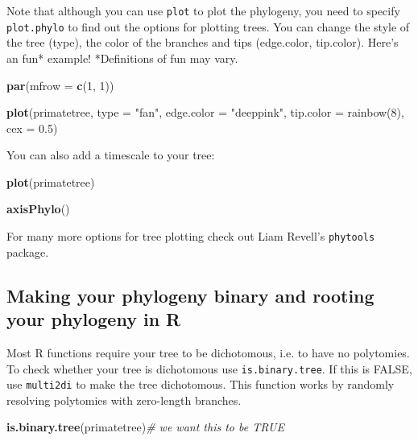 \documentclass[11pt]{article}
\newcommand{\KeywordTok}[1]{\textcolor[rgb]{0.13,0.29,0.53}{\textbf{{#1}}}}
\newcommand{\DataTypeTok}[1]{\textcolor[rgb]{0.13,0.29,0.53}{{#1}}}
\newcommand{\DecValTok}[1]{\textcolor[rgb]{0.00,0.00,0.81}{{#1}}}
\newcommand{\FloatTok}[1]{\textcolor[rgb]{0.00,0.00,0.81}{{#1}}}
\newcommand{\StringTok}[1]{\textcolor[rgb]{0.31,0.60,0.02}{{#1}}}
\newcommand{\CommentTok}[1]{\textcolor[rgb]{0.56,0.35,0.01}{\textit{{#1}}}}
\newcommand{\NormalTok}[1]{{#1}}
\begin{document}
Note that although you can use \texttt{plot} to plot the phylogeny, you need to specify \texttt{plot.phylo} to find out the options for plotting trees. You can change the style of the tree (type), the color of the branches and tips (edge.color, tip.color). Here’s an fun* example! *Definitions of fun may vary.

\begin{snugshade}
\begin{Highlighting}[]
\KeywordTok{par}\NormalTok{(}\DataTypeTok{mfrow =} \KeywordTok{c}\NormalTok{(}\DecValTok{1}\NormalTok{, }\DecValTok{1}\NormalTok{))}

\KeywordTok{plot}\NormalTok{(primatetree, }\DataTypeTok{type =} \StringTok{"fan"}\NormalTok{, }\DataTypeTok{edge.color =} \StringTok{"deeppink"}\NormalTok{, }\DataTypeTok{tip.color =} 
      \StringTok{rainbow(8)}\NormalTok{, }\DataTypeTok{cex =} \FloatTok{0.5}\NormalTok{)}
\end{Highlighting}
\end{snugshade}

You can also add a timescale to your tree:

\begin{snugshade}
\begin{Highlighting}[]
\KeywordTok{plot}\NormalTok{(primatetree)}

\KeywordTok{axisPhylo}\NormalTok{()}
\end{Highlighting}
\end{snugshade}

For many more options for tree plotting check out Liam Revell's \texttt{phytools} package.

\subsection{Making your phylogeny binary and rooting your phylogeny in R}
\label{binary}
Most R functions require your tree to be dichotomous, i.e. to have no polytomies. To check whether your tree is dichotomous use \texttt{is.binary.tree}. If this is FALSE, use \texttt{multi2di} to make the tree dichotomous. This function works by randomly resolving polytomies with zero-length branches.

\begin{snugshade}
\begin{Highlighting}[]
\KeywordTok{is.binary.tree}\NormalTok{(primatetree)}\CommentTok{# we want this to be TRUE}
\end{Highlighting}
\end{snugshade}
\end{document}
